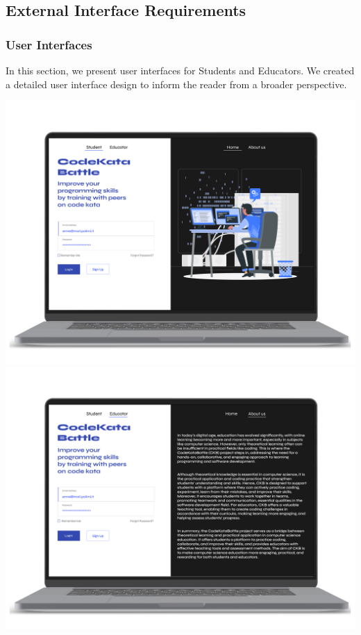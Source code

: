 \subsection{External Interface Requirements}

\subsubsection{User Interfaces}


In this section, we present user interfaces for Students and Educators. We created a detailed user interface design to inform the reader from a broader perspective. 
\begin{center}
    \includegraphics[scale=0.13]{Images/ui-ux/login-signup/student_login.png}
    \includegraphics[scale=0.13]{Images/ui-ux/login-signup/educator_login.png}
\end{center}

